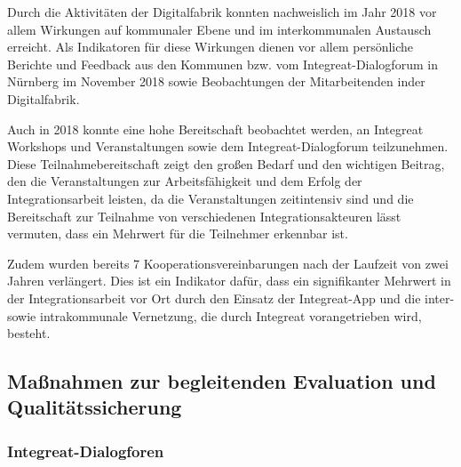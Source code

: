 \documentclass[12pt, a4paper]{article} %
\begin{document}
Durch die Aktivitäten der Digitalfabrik konnten nachweislich im Jahr
2018 vor allem Wirkungen auf kommunaler Ebene und im interkommunalen
Austausch erreicht. Als Indikatoren für diese Wirkungen dienen vor allem
persönliche Berichte und Feedback aus den Kommunen bzw. vom
Integreat-Dialogforum in Nürnberg im November 2018 sowie Beobachtungen
der Mitarbeitenden inder Digitalfabrik.

Auch in 2018 konnte eine hohe Bereitschaft beobachtet werden, an
Integreat Workshops und Veranstaltungen sowie dem Integreat-Dialogforum
teilzunehmen. Diese Teilnahmebereitschaft zeigt den großen Bedarf und
den wichtigen Beitrag, den die Veranstaltungen zur Arbeitsfähigkeit und
dem Erfolg der Integrationsarbeit leisten, da die Veranstaltungen
zeitintensiv sind und die Bereitschaft zur Teilnahme von verschiedenen
Integrationsakteuren lässt vermuten, dass ein Mehrwert für die
Teilnehmer erkennbar ist.

Zudem wurden bereits 7 Kooperationsvereinbarungen nach der Laufzeit von
zwei Jahren verlängert. Dies ist ein Indikator dafür, dass ein
signifikanter Mehrwert in der Integrationsarbeit vor Ort durch den
Einsatz der Integreat-App und die inter- sowie intrakommunale
Vernetzung, die durch Integreat vorangetrieben wird, besteht.

\hypertarget{mauxdfnahmen-zur-begleitenden-evaluation-und-qualituxe4tssicherung}{%
\subsection{Maßnahmen zur begleitenden Evaluation und
Qualitätssicherung}\label{mauxdfnahmen-zur-begleitenden-evaluation-und-qualituxe4tssicherung}}

\hypertarget{integreat-dialogforen}{%
\subsubsection{Integreat-Dialogforen}\label{integreat-dialogforen}}
\end{document}
